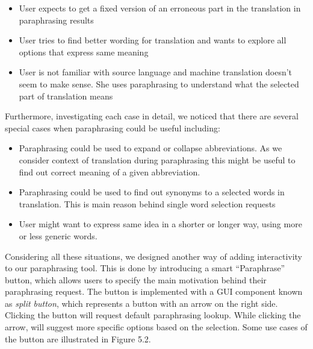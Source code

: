 \begin{itemize}
    \item User expects to get a fixed version of an erroneous part in the translation in paraphrasing results
    \item User tries to find better wording for translation and wants to explore all options that express same meaning
    \item User is not familiar with source language and machine translation doesn't seem to make sense. She uses paraphrasing to understand what the selected part of translation means  
\end{itemize}

Furthermore, investigating each case in detail, we noticed that there are several special cases when paraphrasing could be useful including:

\begin{itemize}
    \item Paraphrasing could be used to expand or collapse abbreviations. As we consider context of translation during paraphrasing this might be useful to find out correct meaning of a given abbreviation.

    \item Paraphrasing could be used to find out synonyms to a selected words in translation. This is main reason behind single word selection requests

    \item User might want to express same idea in a shorter or longer way, using more or less generic words. 
\end{itemize}

Considering all these situations, we designed another way of adding interactivity to our paraphrasing tool. This is done by introducing a smart ``Paraphrase'' button, which allows users to specify the main motivation behind their paraphrasing request. The button is implemented with a GUI component known as \emph{split button}, which represents a button with an arrow on the right side. Clicking the button will request default paraphrasing lookup. While clicking the arrow, will suggest more specific options based on the selection. Some use cases of the button are illustrated in Figure 5.2.   

